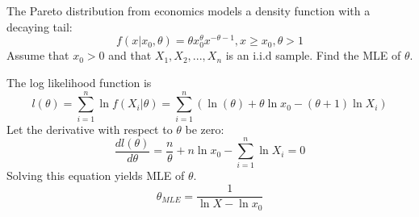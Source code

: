 \begin{Parts}
\Part
The Pareto distribution from economics models a density function with a decaying tail:
$$f(x|x_0, \theta) = \theta x_0^\theta x^{-\theta-1}, x \geq x_0, \theta > 1 $$
Assume that $x_0 > 0$ and that $X_1, X_2,...,X_n$ is an i.i.d sample. Find the MLE of $\theta$.

\begin{solution}
The log likelihood function is 
$$l(\theta) = \sum_{i=1}^{n} \ln f(X_i|\theta) = \sum_{i=1}^{n}(\ln (\theta) + \theta \ln x_0 - (\theta + 1) \ln X_i) $$
Let the derivative with respect to $\theta$ be zero:
$$\frac{dl(\theta)}{d\theta} = \frac{n}{\theta} + n \ln x_0 - \sum_{i=1}^{n} \ln X_i = 0 $$
Solving this equation yields MLE of $\theta$.
$$\theta_{MLE} = \frac{1}{\ln X - \ln x_0} $$
\end{solution}

\end{Parts}

